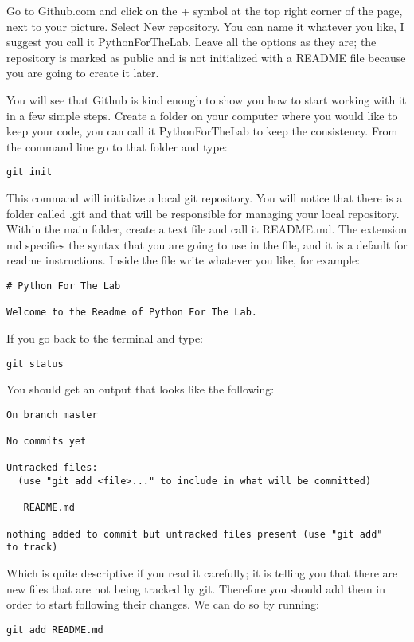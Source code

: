 Go to Github.com and click on the + symbol at the top right corner of the page, next to your picture. Select New repository. You can name it whatever you like, I suggest you call it PythonForTheLab. Leave all the options as they are; the repository is marked as public and is not initialized with a README file because you are going to create it later.

You will see that Github is kind enough to show you how to start working with it in a few simple steps. Create a folder on your computer where you would like to keep your code, you can call it PythonForTheLab to keep the consistency. From the command line go to that folder and type:
\begin{verbatim}
git init
\end{verbatim}
This command will initialize a local git repository. You will notice that there is a folder called .git and that will be responsible for managing your local repository. Within the main folder, create a text file and call it README.md. The extension md specifies the syntax that you are going to use in the file, and it is a default for readme instructions. Inside the file write whatever you like, for example:
\begin{verbatim}
# Python For The Lab

Welcome to the Readme of Python For The Lab. 
\end{verbatim}

If you go back to the terminal and type:
\begin{verbatim}
git status
\end{verbatim}

You should get an output that looks like the following:
\begin{verbatim}
On branch master

No commits yet

Untracked files:
  (use "git add <file>..." to include in what will be committed)

   README.md

nothing added to commit but untracked files present (use "git add" 
to track) 
\end{verbatim}

Which is quite descriptive if you read it carefully; it is telling you that there are new files that are not being tracked by git. Therefore you should add them in order to start following their changes. We can do so by running:
\begin{verbatim}
git add README.md 
\end{verbatim}

